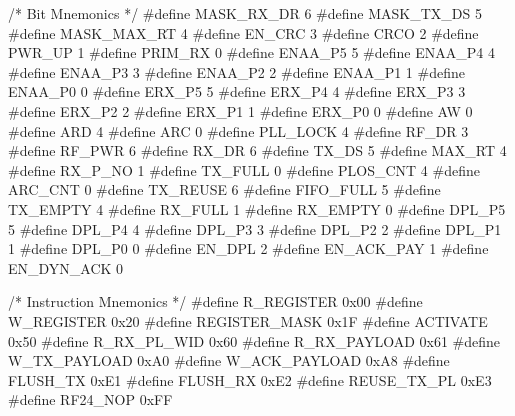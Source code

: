\begin{DoxyCodeInclude}
\textcolor{comment}{/* Bit Mnemonics */}
\textcolor{preprocessor}{#define MASK\_RX\_DR  6}
\textcolor{preprocessor}{#define MASK\_TX\_DS  5}
\textcolor{preprocessor}{#define MASK\_MAX\_RT 4}
\textcolor{preprocessor}{#define EN\_CRC      3}
\textcolor{preprocessor}{#define CRCO        2}
\textcolor{preprocessor}{#define PWR\_UP      1}
\textcolor{preprocessor}{#define PRIM\_RX     0}
\textcolor{preprocessor}{#define ENAA\_P5     5}
\textcolor{preprocessor}{#define ENAA\_P4     4}
\textcolor{preprocessor}{#define ENAA\_P3     3}
\textcolor{preprocessor}{#define ENAA\_P2     2}
\textcolor{preprocessor}{#define ENAA\_P1     1}
\textcolor{preprocessor}{#define ENAA\_P0     0}
\textcolor{preprocessor}{#define ERX\_P5      5}
\textcolor{preprocessor}{#define ERX\_P4      4}
\textcolor{preprocessor}{#define ERX\_P3      3}
\textcolor{preprocessor}{#define ERX\_P2      2}
\textcolor{preprocessor}{#define ERX\_P1      1}
\textcolor{preprocessor}{#define ERX\_P0      0}
\textcolor{preprocessor}{#define AW          0}
\textcolor{preprocessor}{#define ARD         4}
\textcolor{preprocessor}{#define ARC         0}
\textcolor{preprocessor}{#define PLL\_LOCK    4}
\textcolor{preprocessor}{#define RF\_DR       3}
\textcolor{preprocessor}{#define RF\_PWR      6}
\textcolor{preprocessor}{#define RX\_DR       6}
\textcolor{preprocessor}{#define TX\_DS       5}
\textcolor{preprocessor}{#define MAX\_RT      4}
\textcolor{preprocessor}{#define RX\_P\_NO     1}
\textcolor{preprocessor}{#define TX\_FULL     0}
\textcolor{preprocessor}{#define PLOS\_CNT    4}
\textcolor{preprocessor}{#define ARC\_CNT     0}
\textcolor{preprocessor}{#define TX\_REUSE    6}
\textcolor{preprocessor}{#define FIFO\_FULL   5}
\textcolor{preprocessor}{#define TX\_EMPTY    4}
\textcolor{preprocessor}{#define RX\_FULL     1}
\textcolor{preprocessor}{#define RX\_EMPTY    0}
\textcolor{preprocessor}{#define DPL\_P5      5}
\textcolor{preprocessor}{#define DPL\_P4      4}
\textcolor{preprocessor}{#define DPL\_P3      3}
\textcolor{preprocessor}{#define DPL\_P2      2}
\textcolor{preprocessor}{#define DPL\_P1      1}
\textcolor{preprocessor}{#define DPL\_P0      0}
\textcolor{preprocessor}{#define EN\_DPL      2}
\textcolor{preprocessor}{#define EN\_ACK\_PAY  1}
\textcolor{preprocessor}{#define EN\_DYN\_ACK  0}

\textcolor{comment}{/* Instruction Mnemonics */}
\textcolor{preprocessor}{#define R\_REGISTER    0x00}
\textcolor{preprocessor}{#define W\_REGISTER    0x20}
\textcolor{preprocessor}{#define REGISTER\_MASK 0x1F}
\textcolor{preprocessor}{#define ACTIVATE      0x50}
\textcolor{preprocessor}{#define R\_RX\_PL\_WID   0x60}
\textcolor{preprocessor}{#define R\_RX\_PAYLOAD  0x61}
\textcolor{preprocessor}{#define W\_TX\_PAYLOAD  0xA0}
\textcolor{preprocessor}{#define W\_ACK\_PAYLOAD 0xA8}
\textcolor{preprocessor}{#define FLUSH\_TX      0xE1}
\textcolor{preprocessor}{#define FLUSH\_RX      0xE2}
\textcolor{preprocessor}{#define REUSE\_TX\_PL   0xE3}
\textcolor{preprocessor}{#define RF24\_NOP      0xFF}


\end{DoxyCodeInclude}

